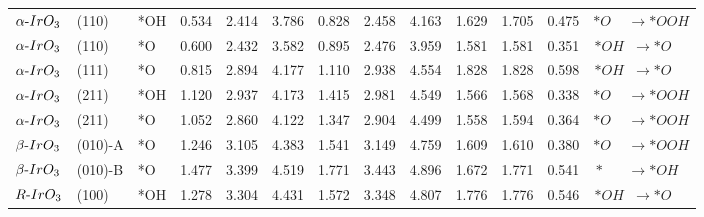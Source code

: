 \begin{tabular}{lllcccccccccc}
 $\alpha{\text -}IrO_{3}$ &    (110) &         *OH &            0.534 &           2.414 &             3.786 &            0.828 &           2.458 &             4.163 &                          1.629 &     1.705 &  0.475 &                         $*O \phantom{T} \phantom{T}  \rightarrow *OOH$ \\
 $\alpha{\text -}IrO_{3}$ &    (110) &          *O &            0.600 &           2.432 &             3.582 &            0.895 &           2.476 &             3.959 &                          1.581 &     1.581 &  0.351 &              $*OH \phantom{T} \rightarrow *O \phantom{T} \phantom{T} $ \\
 $\alpha{\text -}IrO_{3}$ &    (111) &          *O &            0.815 &           2.894 &             4.177 &            1.110 &           2.938 &             4.554 &                          1.828 &     1.828 &  0.598 &              $*OH \phantom{T} \rightarrow *O \phantom{T} \phantom{T} $ \\
 $\alpha{\text -}IrO_{3}$ &    (211) &         *OH &            1.120 &           2.937 &             4.173 &            1.415 &           2.981 &             4.549 &                          1.566 &     1.568 &  0.338 &                         $*O \phantom{T} \phantom{T}  \rightarrow *OOH$ \\
 $\alpha{\text -}IrO_{3}$ &    (211) &          *O &            1.052 &           2.860 &             4.122 &            1.347 &           2.904 &             4.499 &                          1.558 &     1.594 &  0.364 &                         $*O \phantom{T} \phantom{T}  \rightarrow *OOH$ \\
  $\beta{\text -}IrO_{3}$ &  (010)-A &          *O &            1.246 &           3.105 &             4.383 &            1.541 &           3.149 &             4.759 &                          1.609 &     1.610 &  0.380 &                         $*O \phantom{T} \phantom{T}  \rightarrow *OOH$ \\
  $\beta{\text -}IrO_{3}$ &  (010)-B &          *O &            1.477 &           3.399 &             4.519 &            1.771 &           3.443 &             4.896 &                          1.672 &     1.771 &  0.541 &  $* \phantom{T} \phantom{T} \phantom{T}  \rightarrow *OH \phantom{T} $ \\
      $R{\text -}IrO_{3}$ &    (100) &         *OH &            1.278 &           3.304 &             4.431 &            1.572 &           3.348 &             4.807 &                          1.776 &     1.776 &  0.546 &              $*OH \phantom{T} \rightarrow *O \phantom{T} \phantom{T} $ \\

\end{tabular}
